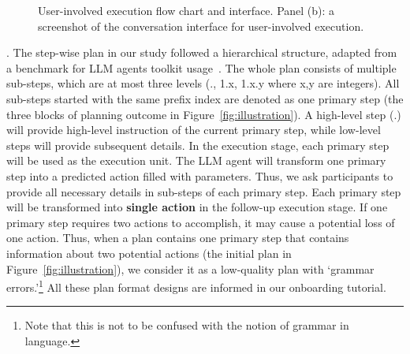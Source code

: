 \begin{figure*}[htbp]
 \centering
  \subfigure[]%
  {\label{fig:execution-flow-chart}
  \centering
  \texttt{[image: figures/execution\_stages-new.pdf]}
 }
  \subfigure[]%
  {\label{fig:execution-interface}
  \centering
  \texttt{[image: figures/execution-interface.png]}
 }
 \centering
 \caption{User-involved execution flow chart and interface.  Panel (b): a screenshot of the conversation interface for user-involved execution.
 }
 \label{fig-interface}
\end{figure*}

. 
The step-wise plan in our study followed a hierarchical structure, adapted from a benchmark for LLM agents toolkit usage~\cite{huang2024planning}. 
The whole plan consists of multiple sub-steps, which are at most three levels (., 1.x, 1.x.y where x,y are integers). 
All sub-steps started with the same prefix index are denoted as one primary step (\eg the three blocks of planning outcome in Figure~\ref{fig:illustration}). 
A high-level step (.) will provide high-level instruction of the current primary step, while low-level steps  will provide subsequent details. 
In the execution stage, each primary step will be used as the execution unit. 
The LLM agent will transform one primary step into a predicted action filled with parameters. 
Thus, we ask participants to provide all necessary details in sub-steps of each primary step. {Each primary step will be transformed into \textbf{single action} in the follow-up execution stage}. 
If one primary step requires two actions to accomplish, it may cause a potential loss of one action. 
Thus, when a plan contains one primary step that contains information about two potential actions (\eg the initial plan in Figure~\ref{fig:illustration}), we consider it as a low-quality plan with `grammar errors.'\footnote{Note that this is not to be confused with the notion of grammar in language.} 
All these plan format designs are informed in our onboarding tutorial.


